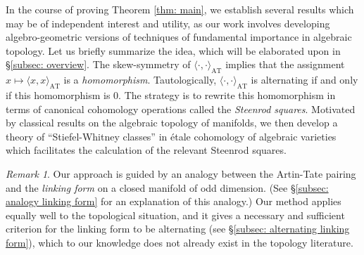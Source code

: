 \documentclass[10pt, reqno]{amsart}
\numberwithin{equation}{subsection}
\newcommand{\mrm}[1]{\mathrm{#1}}
\theoremstyle{remark}
\newtheorem{remark}[thm]{Remark}
\begin{document}
In the course of proving Theorem \ref{thm: main}, we establish several results which may be of independent interest and utility, as our work involves developing algebro-geometric versions of techniques of fundamental importance in algebraic topology. Let us briefly summarize the idea, which will be elaborated upon in \S \ref{subsec: overview}. The skew-symmetry of $\langle  \cdot, \cdot \rangle_{\mrm{AT}} $ implies that the assignment $x \mapsto \langle x,x \rangle_{\mrm{AT}}$ is a \emph{homomorphism}. Tautologically, $\langle  \cdot, \cdot \rangle_{\mrm{AT}}$ is alternating if and only if this homomorphism is $0$. The strategy is to rewrite this homomorphism in terms of canonical cohomology operations called the \emph{Steenrod squares}. Motivated by classical results on the algebraic topology of manifolds, we then develop a theory of ``Stiefel-Whitney classes'' in \'{e}tale cohomology of algebraic varieties which facilitates the calculation of the relevant Steenrod squares. 	

\begin{remark}\label{rem: analogy}
Our approach is guided by an analogy between the Artin-Tate pairing and the \emph{linking form} on a closed manifold of odd dimension. (See \S \ref{subsec: analogy linking form} for an explanation of this analogy.) Our method applies equally well to the topological situation, and it gives a necessary and sufficient criterion for the linking form to be alternating (see  \S \ref{subsec: alternating linking form}), which to our knowledge does not already exist in the topology literature. 
\end{remark}



\end{document}
